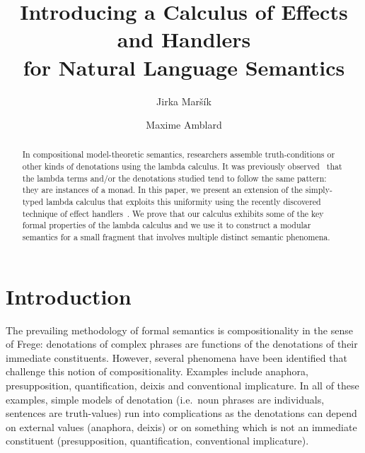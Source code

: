 \documentclass{llncs}
\begin{document}
%
\title{Introducing a Calculus of Effects and Handlers \\ for Natural Language Semantics}
%
\author{Jirka Maršík \and Maxime Amblard}



\maketitle              %

\begin{abstract}
In compositional model-theoretic semantics, researchers assemble
truth-conditions or other kinds of denotations using the lambda
calculus. It was previously observed~\cite{shan2002monads} that the lambda
terms and/or the denotations studied tend to follow the same pattern: they
are instances of a monad. In this paper, we present an extension of the
simply-typed lambda calculus that exploits this uniformity using the
recently discovered technique of effect
handlers~\cite{plotkin2009handlers}. We prove that our calculus exhibits
some of the key formal properties of the lambda calculus and we use it to
construct a modular semantics for a small fragment that involves multiple
distinct semantic phenomena.

\end{abstract}
%

\section{Introduction}
\label{sec:introduction}

The prevailing methodology of formal semantics is compositionality in the
sense of Frege: denotations of complex phrases are functions of the
denotations of their immediate constituents. However, several phenomena
have been identified that challenge this notion of
compositionality. Examples include anaphora, presupposition,
quantification, deixis and conventional implicature. In all of these
examples, simple models of denotation (i.e.\ noun phrases are individuals,
sentences are truth-values) run into complications as the denotations can
depend on external values (anaphora, deixis) or on something which is not
an immediate constituent (presupposition, quantification, conventional
implicature).
\end{document}
